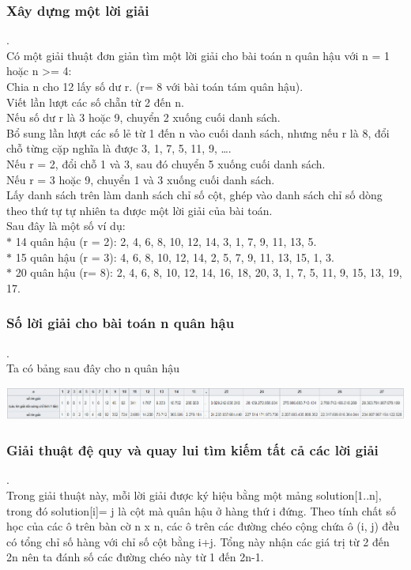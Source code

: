 \documentclass{hcmutarticle}
\begin{document}
\subsubsection{Xây dựng một lời giải}.
\\
Có một giải thuật đơn giản tìm một lời giải cho bài toán n quân hậu với n = 1 hoặc n >= 4:\\
Chia n cho 12 lấy số dư r. (r= 8 với bài toán tám quân hậu).\\
Viết lần lượt các số chẵn từ 2 đến n.\\
Nếu số dư r là 3 hoặc 9, chuyển 2 xuống cuối danh sách.\\
Bổ sung lần lượt các số lẻ từ 1 đến n vào cuối danh sách, nhưng nếu r là 8, đổi chỗ từng cặp nghĩa là được 3, 1, 7, 5, 11, 9, ….\\
Nếu r = 2, đổi chỗ 1 và 3, sau đó chuyển 5 xuống cuối danh sách.\\
Nếu r = 3 hoặc 9, chuyển 1 và 3 xuống cuối danh sách.\\
Lấy danh sách trên làm danh sách chỉ số cột, ghép vào danh sách chỉ số dòng theo thứ tự tự nhiên ta được một lời giải của bài toán.\\
Sau đây là một số ví dụ: \\
$*$ 14 quân hậu (r = 2): 2, 4, 6, 8, 10, 12, 14, 3, 1, 7, 9, 11, 13, 5.\\
$*$ 15 quân hậu (r = 3): 4, 6, 8, 10, 12, 14, 2, 5, 7, 9, 11, 13, 15, 1, 3.\\
$*$ 20 quân hậu (r= 8): 2, 4, 6, 8, 10, 12, 14, 16, 18, 20, 3, 1, 7, 5, 11, 9, 15, 13, 19, 17.\\

\subsubsection{Số lời giải cho bài toán n quân hậu}.
\\
Ta có bảng sau đây cho n quân hậu
\begin{center}
\includegraphics[scale=0.45]{image/n-board}\\[1cm]
\end{center}

\subsubsection{Giải thuật đệ quy và quay lui tìm kiếm tất cả các lời giải}.
\\
Trong giải thuật này, mỗi lời giải được ký hiệu bằng một mảng solution[1$..$n], trong đó solution[i]= j là cột mà quân hậu ở hàng thứ i đứng. Theo tính chất số học của các ô trên bàn cờ n x n, các ô trên các đường chéo cộng chứa ô (i, j) đều có tổng chỉ số hàng với chỉ số cột bằng i+j. Tổng này nhận các giá trị từ 2 đến 2n nên ta đánh số các đường chéo này từ 1 đến 2n-1. \\
\end{document}
